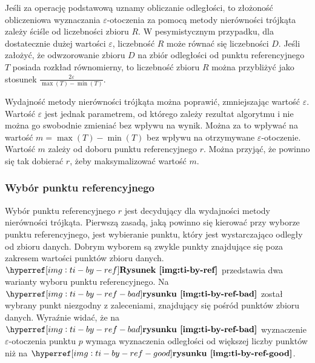 Jeśli za operację podstawową uznamy obliczanie odległości, to złożoność obliczeniowa wyznaczania $ \varepsilon $-otoczenia za pomocą metody nierówności trójkąta zależy ściśle od liczebności zbioru $ R $. W pesymistycznym przypadku, dla dostatecznie dużej wartości $ \varepsilon $, liczebność $ R $ może równać się liczebności $ D $. Jeśli założyć, że odwzorowanie zbioru $ D $ na zbiór odległości od punktu referencyjnego $ T $ posiada rozkład równomierny, to liczebność zbioru $ R $ można przybliżyć jako stosunek $ \frac{2\varepsilon}{\max(T)-\min(T)} $. 

Wydajność metody nierówności trójkąta można poprawić, zmniejszając wartość $ \varepsilon $. Wartość $ \varepsilon $ jest jednak parametrem, od którego zależy rezultat algorytmu i nie można go swobodnie zmieniać bez wpływu na wynik. Można za to wpływać na wartość $ m=\max(T)-\min(T) $ bez wpływu na otrzymywane $ \varepsilon $-otoczenie. Wartość $ m $ zależy od doboru punktu referencyjnego $ r $. Można przyjąć, że powinno się tak dobierać $ r $, żeby maksymalizować wartość $ m $. 

\subsubsection{Wybór punktu referencyjnego}
Wybór punktu referencyjnego  $ r $ jest decydujący dla wydajności metody nierówności trójkąta. Pierwszą zasadą, jaką powinno się kierować przy wyborze punktu referencyjnego, jest wybieranie punktu, który jest wystarczająco odległy od zbioru danych. Dobrym wyborem są zwykle punkty znajdujące się poza zakresem wartości punktów zbioru danych. $ \myhyperref{img:ti-by-ref}{Rysunek} $ przedstawia dwa warianty wyboru punktu referencyjnego. Na $ \myhyperref{img:ti-by-ref-bad}{rysunku} $ został wybrany punkt niezgodny z zaleceniami, znajdujący się pośród punktów zbioru danych. Wyraźnie widać, że na $ \myhyperref{img:ti-by-ref-bad}{rysunku} $ wyznaczenie $ \varepsilon $-otoczenia punktu $ p $ wymaga wyznaczenia odległości od większej liczby punktów niż na $ \myhyperref{img:ti-by-ref-good}{rysunku} $.


